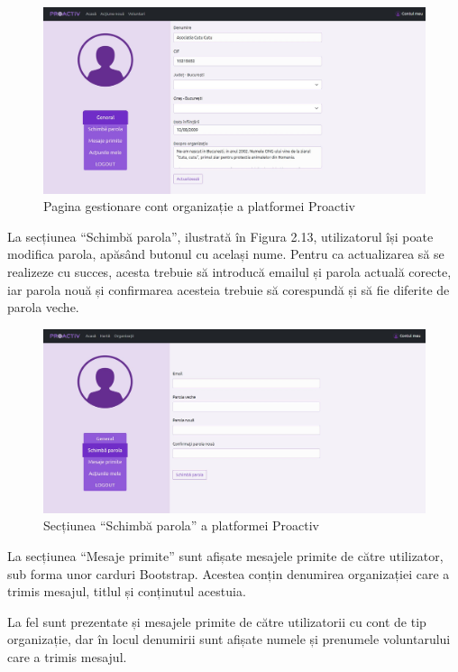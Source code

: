 \documentclass[12pt,a4paper]{report}
\begin{document}
\begin{figure}[H]
\centering
  \includegraphics[width=1\linewidth]{./imagini/cont1org.jpg}
  \caption{Pagina gestionare cont organizație a platformei Proactiv}
\end{figure}
\par
La secțiunea “Schimbă parola”, ilustrată în Figura 2.13, utilizatorul își poate modifica parola, apăsând butonul cu același nume. Pentru ca actualizarea să se realizeze cu succes, acesta trebuie să introducă emailul și parola actuală corecte, iar parola nouă și confirmarea acesteia trebuie să corespundă și să fie diferite de parola veche.
\\
\begin{figure}[H]
\centering
  \includegraphics[width=1\linewidth]{./imagini/cont2.jpg}
  \caption{Secțiunea “Schimbă parola” a platformei Proactiv}
\end{figure}
\newpage
La secțiunea “Mesaje primite” sunt afișate mesajele primite de către utilizator, sub forma unor carduri Bootstrap. Acestea conțin denumirea organizației care a trimis mesajul, titlul și conținutul acestuia.
\par
La fel sunt prezentate și mesajele primite de către utilizatorii cu cont de tip organizație, dar în locul denumirii sunt afișate numele și prenumele voluntarului care a trimis mesajul.
\end{document}
